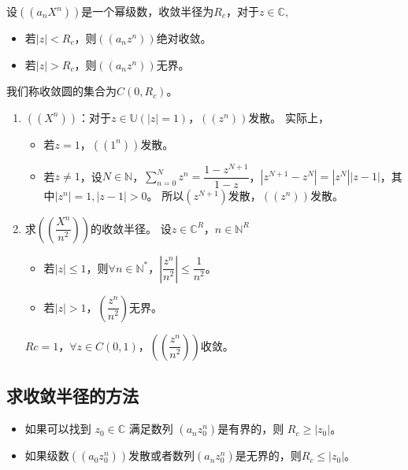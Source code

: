 \documentclass[math_note.tex]{subfiles}
\begin{document}
\begin{newthem}
	设$((a_{n}X^{n}))$是一个幂级数，收敛半径为$R_{c}$，对于$z \in \mathbb{C}$,
	\begin{itemize}
		\item 若$|z|<R_{c}$，则$((a_{n}z^{n}))$绝对收敛。
		\item 若$|z|>R_{c}$，则$((a_{n}z^{n}))$无界。
	\end{itemize}
\end{newthem}

\begin{newproof}
	
\end{newproof}

\begin{newdef}
	我们称收敛圆的集合为$C(0,R_{c})$。
\end{newdef}

\begin{example}
	\begin{enumerate}
		\item $((X^{n}))$：对于$z \in \mathbb{U}(|z|=1)$，$((z^{n}))$发散。
		实际上，
		\begin{itemize}
			\item 若$z=1$，$((1^{n}))$发散。
			\item 若$z\neq1$，设$N \in \mathbb{N}$，$ \sum\limits^{N}_{n=0} z^{n} = 
			\dfrac{1-z^{N+1}}{1-z}$，$|z^{N+1}-z^{N}|=|z^{N}||z-1|$，其中$|z^{n}|=1,|z-1|>0$。
			所以$(z^{N+1})$发散，$((z^{n}))$发散。
		\end{itemize}
		\item 求$((\dfrac{X^{n}}{n^{2}}))$的收敛半径。
		设$z \in \mathbb{C}^{R}$，$n \in \mathbb{N}^{R}$
		\begin{itemize}
			\item 若$|z|\leq1$，则$\forall n \in \mathbb{N}^{*}$，$|\dfrac{z^{n}}{n^{2}}|
			 \leq \dfrac{1}{n^{2}}$。
			\item 若$|z|>1$，$(\dfrac{z^{n}}{n^{2}})$无界。
		\end{itemize}
		\begin{conclusion}
			$Rc=1$，$\forall z \in C(0,1)$，$((\dfrac{z^{n}}{n^{2}}))$收敛。
		\end{conclusion}
	\end{enumerate}
\end{example}

\subsection{求收敛半径的方法}
\begin{itemize}
	\item 如果可以找到 $z_{0} \in \mathbb{C}$ 满足数列 $(a_{n}z_{0}^{n})$是有界的，则 $R_{c} 
	\geq |z_{0}|$。
	\item 如果级数$((a_{0}z_{0}^{n}))$发散或者数列$(a_{n}z_{0}^{n})$是无界的，则$R_{c} \leq
	 |z_{0}|$。
\end{itemize}
\end{document}
